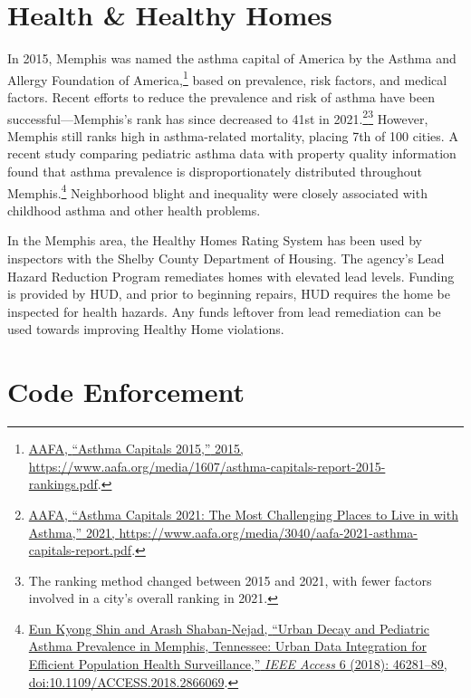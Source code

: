 \documentclass[
  openany]{book}
\begin{document}
\hypertarget{health-healthy-homes}{%
\section{Health \& Healthy Homes}\label{health-healthy-homes}}

In 2015, Memphis was named the asthma capital of America by the Asthma and Allergy Foundation of America,\footnote{\protect\hyperlink{ref-aafa2015}{AAFA, {``Asthma Capitals 2015,''} 2015, \url{https://www.aafa.org/media/1607/asthma-capitals-report-2015-rankings.pdf}}.} based on prevalence, risk factors, and medical factors. Recent efforts to reduce the prevalence and risk of asthma have been successful---Memphis's rank has since decreased to 41st in 2021.\footnote{\protect\hyperlink{ref-aafa2021}{AAFA, {``Asthma Capitals 2021: The Most Challenging Places to Live in with Asthma,''} 2021, \url{https://www.aafa.org/media/3040/aafa-2021-asthma-capitals-report.pdf}}.}\footnote{The ranking method changed between 2015 and 2021, with fewer factors involved in a city's overall ranking in 2021.} However, Memphis still ranks high in asthma-related mortality, placing 7th of 100 cities. A recent study comparing pediatric asthma data with property quality information found that asthma prevalence is disproportionately distributed throughout Memphis.\footnote{\protect\hyperlink{ref-shin2018}{Eun Kyong Shin and Arash Shaban-Nejad, {``Urban Decay and Pediatric Asthma Prevalence in Memphis, Tennessee: Urban Data Integration for Efficient Population Health Surveillance,''} \emph{IEEE Access} 6 (2018): 46281--89, doi:\href{https://doi.org/10.1109/ACCESS.2018.2866069}{10.1109/ACCESS.2018.2866069}}.} Neighborhood blight and inequality were closely associated with childhood asthma and other health problems.

In the Memphis area, the Healthy Homes Rating System has been used by inspectors with the Shelby County Department of Housing. The agency's Lead Hazard Reduction Program remediates homes with elevated lead levels. Funding is provided by HUD, and prior to beginning repairs, HUD requires the home be inspected for health hazards. Any funds leftover from lead remediation can be used towards improving Healthy Home violations.

\hypertarget{code-enforcement}{%
\section{Code Enforcement}\label{code-enforcement}}
\end{document}
